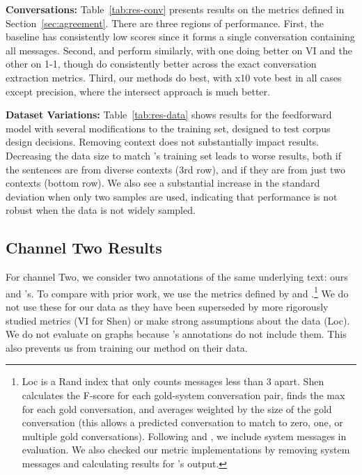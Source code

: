 \documentclass[11pt,a4paper]{article}
\newcommand{\tightparagraph}[1]{\noindent\textbf{#1:}}
\begin{document}
\tightparagraph{Conversations}
Table~\ref{tab:res-conv} presents results on the metrics defined in Section~\ref{sec:agreement}.
There are three regions of performance.
First, the baseline has consistently low scores since it forms a single conversation containing all messages.
Second, \citet{elsner:2008} and \citet{Lowe:2017:DD} perform similarly, with one doing better on VI and the other on 1-1, though \citet{elsner:2008} do consistently better across the exact conversation extraction metrics.
Third, our methods do best, with x10 vote best in all cases except precision, where the intersect approach is much better.

\tightparagraph{Dataset Variations}
Table~\ref{tab:res-data} shows results for the feedforward model with several modifications to the training set, designed to test corpus design decisions.
Removing context does not substantially impact results.
Decreasing the data size to match \citet{elsner:2008}'s training set leads to worse results, both if the sentences are from diverse contexts (3rd row), and if they are from just two contexts (bottom row).
We also see a substantial increase in the standard deviation when only two samples are used, indicating that performance is not robust when the data is not widely sampled.

\subsection{Channel Two Results}

For channel Two, we consider two annotations of the same underlying text: ours and \citet{elsner:2008}'s.
To compare with prior work, we use the metrics defined by \citet[Shen]{Shen:2006} and \citet[Loc]{elsner:2008}.\footnote{
Loc is a Rand index that only counts messages less than 3 apart.
Shen calculates the F-score for each gold-system conversation pair, finds the max for each gold conversation, and averages weighted by the size of the gold conversation (this allows a predicted conversation to match to zero, one, or multiple gold conversations).
Following \citet{Wang:2009} and \citet{Mehri:2017:IJCNLP}, we include system messages in evaluation.
We also checked our metric implementations by removing system messages and calculating results for \citet{elsner:2008}'s output.
}
We do not use these for our data as they have been superseded by more rigorously studied metrics (VI for Shen) or make strong assumptions about the data (Loc).
We do not evaluate on graphs because \citet{elsner:2008}'s annotations do not include them.
This also prevents us from training our method on their data.
\end{document}
